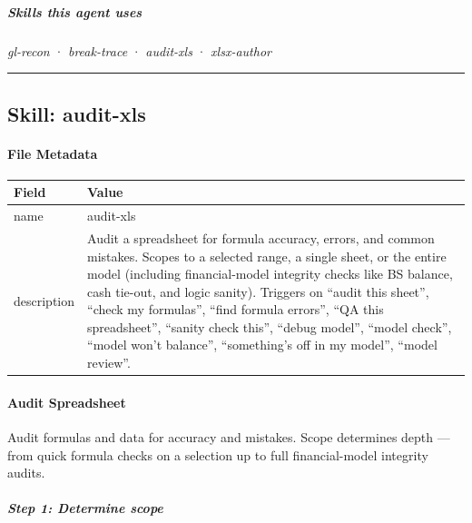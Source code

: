 \documentclass[11pt]{article}
\begin{document}
\subparagraph{Skills this agent uses}\mbox{}\par

\emph{gl-recon} · \emph{break-trace} · \emph{audit-xls} · \emph{xlsx-author}


\vspace{0.8em}\hrule\vspace{0.8em}

\subsection{Skill: audit-xls}\label{file:gl-reconciler-skills-audit-xls-SKILL-md}

\paragraph{File Metadata}\mbox{}\par
\begingroup
\small
\setlength{\tabcolsep}{2pt}
\begin{longtable}{>{\RaggedRight\arraybackslash\hspace{0pt}}p{}>{\RaggedRight\arraybackslash\hspace{0pt}}p{}}
\toprule
{} \textbf{Field} & \textbf{Value} \\
\midrule
{} name & audit-xls \\
{} description & Audit a spreadsheet for formula accuracy, errors, and common mistakes. Scopes to a selected range, a single sheet, or the entire model (including financial-model integrity checks like BS balance, cash tie-out, and logic sanity). Triggers on ``audit this sheet'', ``check my formulas'', ``find formula errors'', ``QA this spreadsheet'', ``sanity check this'', ``debug model'', ``model check'', ``model won't balance'', ``something's off in my model'', ``model review''. \\
\bottomrule
\end{longtable}
\endgroup


\paragraph{Audit Spreadsheet}\mbox{}\par

Audit formulas and data for accuracy and mistakes. Scope determines depth — from quick formula checks on a selection up to full financial-model integrity audits.


\subparagraph{Step 1: Determine scope}\mbox{}\par
\end{document}
